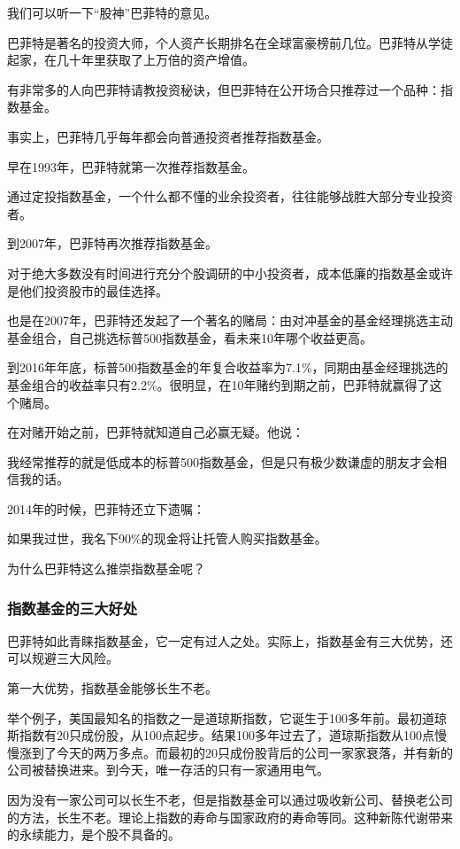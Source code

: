 我们可以听一下“股神”巴菲特的意见。

巴菲特是著名的投资大师，个人资产长期排名在全球富豪榜前几位。巴菲特从学徒起家，在几十年里获取了上万倍的资产增值。

有非常多的人向巴菲特请教投资秘诀，但巴菲特在公开场合只推荐过一个品种：指数基金。

事实上，巴菲特几乎每年都会向普通投资者推荐指数基金。

早在1993年，巴菲特就第一次推荐指数基金。

{\kaishu 通过定投指数基金，一个什么都不懂的业余投资者，往往能够战胜大部分专业投资者。}

到2007年，巴菲特再次推荐指数基金。

{\kaishu 对于绝大多数没有时间进行充分个股调研的中小投资者，成本低廉的指数基金或许是他们投资股市的最佳选择。}

也是在2007年，巴菲特还发起了一个著名的赌局：由对冲基金的基金经理挑选主动基金组合，自己挑选标普500指数基金，看未来10年哪个收益更高。

到2016年年底，标普500指数基金的年复合收益率为7.1\%，同期由基金经理挑选的基金组合的收益率只有2.2\%。很明显，在10年赌约到期之前，巴菲特就赢得了这个赌局。

在对赌开始之前，巴菲特就知道自己必赢无疑。他说：

{\kaishu 我经常推荐的就是低成本的标普500指数基金，但是只有极少数谦虚的朋友才会相信我的话。}

2014年的时候，巴菲特还立下遗嘱：

{\kaishu 如果我过世，我名下90\%的现金将让托管人购买指数基金。}

为什么巴菲特这么推崇指数基金呢？

\subsubsection{指数基金的三大好处}

巴菲特如此青睐指数基金，它一定有过人之处。实际上，指数基金有三大优势，还可以规避三大风险。

第一大优势，指数基金能够长生不老。

举个例子，美国最知名的指数之一是道琼斯指数，它诞生于100多年前。最初道琼斯指数有20只成份股，从100点起步。结果100多年过去了，道琼斯指数从100点慢慢涨到了今天的两万多点。而最初的20只成份股背后的公司一家家衰落，并有新的公司被替换进来。到今天，唯一存活的只有一家通用电气。

因为没有一家公司可以长生不老，但是指数基金可以通过吸收新公司、替换老公司的方法，长生不老。理论上指数的寿命与国家政府的寿命等同。这种新陈代谢带来的永续能力，是个股不具备的。

